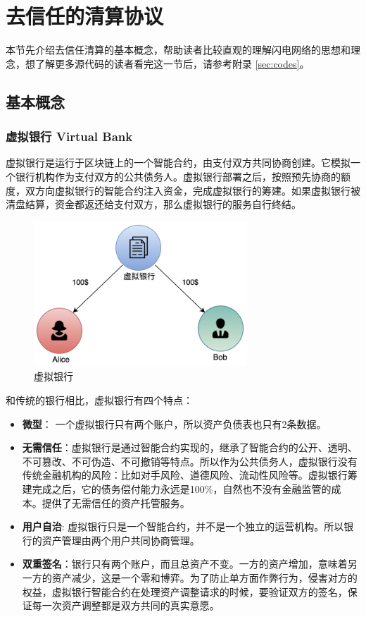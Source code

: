 \section{去信任的清算协议}\label{sec:clearing}

本节先介绍去信任清算的基本概念，帮助读者比较直观的理解闪电网络的思想和理念，想了解更多源代码的读者看完这一节后，请参考附录 \ref{sec:codes}。

\subsection{基本概念}

\subsubsection{虚拟银行 Virtual Bank}
虚拟银行是运行于区块链上的一个智能合约，由支付双方共同协商创建。它模拟一个银行机构作为支付双方的公共债务人。虚拟银行部署之后，按照预先协商的额度，双方向虚拟银行的智能合约注入资金，完成虚拟银行的筹建。如果虚拟银行被清盘结算，资金都返还给支付双方，那么虚拟银行的服务自行终结。

\begin{figure}[h!]
    \centering
    \includegraphics[width=8cm, keepaspectratio]{../images/channel.png}
    \caption{虚拟银行}
    \label{fig:virtualbank}
\end{figure}

和传统的银行相比，虚拟银行有四个特点：

\begin{itemize}
    \item \textbf{微型}： 一个虚拟银行只有两个账户，所以资产负债表也只有2条数据。
    \item \textbf{无需信任}：虚拟银行是通过智能合约实现的，继承了智能合约的公开、透明、不可篡改、不可伪造、不可撤销等特点。所以作为公共债务人，虚拟银行没有传统金融机构的风险：比如对手风险、道德风险、流动性风险等。虚拟银行筹建完成之后，它的债务偿付能力永远是100\%，自然也不没有金融监管的成本。提供了无需信任的资产托管服务。
    \item \textbf{用户自治}: 虚拟银行只是一个智能合约，并不是一个独立的运营机构。所以银行的资产管理由两个用户共同协商管理。
    \item \textbf{双重签名}：银行只有两个账户，而且总资产不变。一方的资产增加，意味着另一方的资产减少，这是一个零和博弈。为了防止单方面作弊行为，侵害对方的权益，虚拟银行智能合约在处理资产调整请求的时候，要验证双方的签名，保证每一次资产调整都是双方共同的真实意愿。
\end{itemize}


